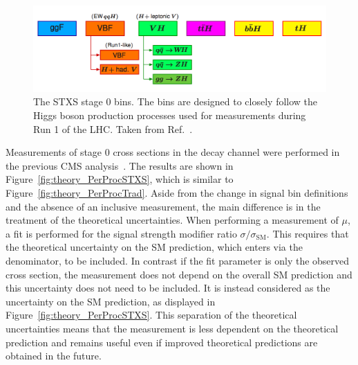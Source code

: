 \begin{figure}[hptb]
  \centering
  \includegraphics[width=\textwidth]{Figures/Theory/stage0.png}
  \caption[Stage 0 STXS bins.]
  {
    The STXS stage 0 bins. 
    The bins are designed to closely follow the Higgs boson production processes
    used for measurements during Run 1 of the LHC.
    Taken from Ref.~\cite{YR4}.
  }
  \label{fig:theory_stage0}
\end{figure}

Measurements of stage 0 cross sections in the \Hgg decay channel 
were performed in the previous CMS \Hgg analysis~\cite{HIG-16-040}.
The results are shown in Figure~\ref{fig:theory_PerProcSTXS}, 
which is similar to Figure~\ref{fig:theory_PerProcTrad}.
Aside from the change in signal bin definitions and the absence of an inclusive measurement, 
the main difference is in the treatment of the theoretical uncertainties.
When performing a measurement of $\mu$, 
a fit is performed for the signal strength modifier ratio $\sigma/\sigma_{\textrm{SM}}$. 
This requires that the theoretical uncertainty on the SM prediction, 
which enters via the denominator, to be included.
In contrast if the fit parameter is only the observed cross section, 
the measurement does not depend on the overall SM prediction 
and this uncertainty does not need to be included.
It is instead considered as the uncertainty on the SM prediction, 
as displayed in Figure~\ref{fig:theory_PerProcSTXS}.
This separation of the theoretical uncertainties means that the measurement is less dependent 
on the theoretical prediction and remains useful 
even if improved theoretical predictions are obtained in the future.

